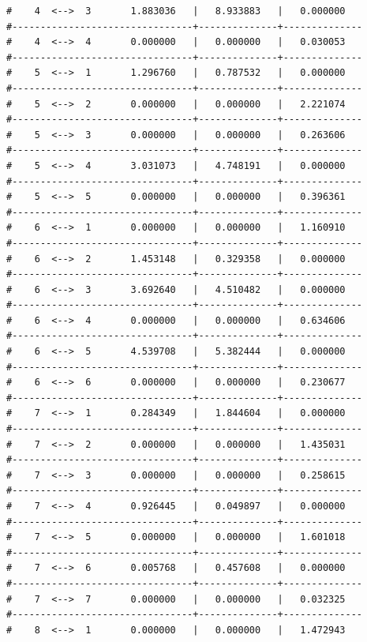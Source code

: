 \begin{enumerate}
{\begin{verbatim}
#    4  <-->  3       1.883036   |   8.933883   |   0.000000   
#--------------------------------+--------------+--------------
#    4  <-->  4       0.000000   |   0.000000   |   0.030053   
#--------------------------------+--------------+--------------
#    5  <-->  1       1.296760   |   0.787532   |   0.000000   
#--------------------------------+--------------+--------------
#    5  <-->  2       0.000000   |   0.000000   |   2.221074   
#--------------------------------+--------------+--------------
#    5  <-->  3       0.000000   |   0.000000   |   0.263606   
#--------------------------------+--------------+--------------
#    5  <-->  4       3.031073   |   4.748191   |   0.000000   
#--------------------------------+--------------+--------------
#    5  <-->  5       0.000000   |   0.000000   |   0.396361   
#--------------------------------+--------------+--------------
#    6  <-->  1       0.000000   |   0.000000   |   1.160910   
#--------------------------------+--------------+--------------
#    6  <-->  2       1.453148   |   0.329358   |   0.000000   
#--------------------------------+--------------+--------------
#    6  <-->  3       3.692640   |   4.510482   |   0.000000   
#--------------------------------+--------------+--------------
#    6  <-->  4       0.000000   |   0.000000   |   0.634606   
#--------------------------------+--------------+--------------
#    6  <-->  5       4.539708   |   5.382444   |   0.000000   
#--------------------------------+--------------+--------------
#    6  <-->  6       0.000000   |   0.000000   |   0.230677   
#--------------------------------+--------------+--------------
#    7  <-->  1       0.284349   |   1.844604   |   0.000000   
#--------------------------------+--------------+--------------
#    7  <-->  2       0.000000   |   0.000000   |   1.435031   
#--------------------------------+--------------+--------------
#    7  <-->  3       0.000000   |   0.000000   |   0.258615   
#--------------------------------+--------------+--------------
#    7  <-->  4       0.926445   |   0.049897   |   0.000000   
#--------------------------------+--------------+--------------
#    7  <-->  5       0.000000   |   0.000000   |   1.601018   
#--------------------------------+--------------+--------------
#    7  <-->  6       0.005768   |   0.457608   |   0.000000   
#--------------------------------+--------------+--------------
#    7  <-->  7       0.000000   |   0.000000   |   0.032325   
#--------------------------------+--------------+--------------
#    8  <-->  1       0.000000   |   0.000000   |   1.472943   

\end{verbatim}}
\end{enumerate}
